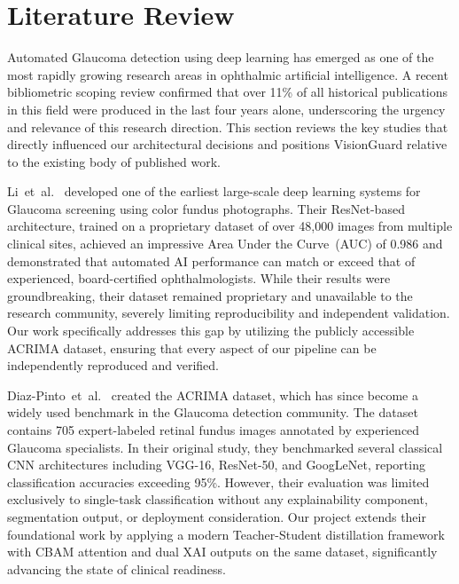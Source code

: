 \documentclass[conference]{IEEEtran}
\begin{document}
\section{Literature Review}

Automated Glaucoma detection using deep learning has emerged as one of the most rapidly growing research areas in ophthalmic artificial intelligence. A recent bibliometric scoping review confirmed that over 11\% of all historical publications in this field were produced in the last four years alone, underscoring the urgency and relevance of this research direction. This section reviews the key studies that directly influenced our architectural decisions and positions VisionGuard relative to the existing body of published work.

Li~et~al.~\cite{li2018} developed one of the earliest large-scale deep learning systems for Glaucoma screening using color fundus photographs. Their ResNet-based architecture, trained on a proprietary dataset of over 48,000 images from multiple clinical sites, achieved an impressive Area Under the Curve~(AUC) of 0.986 and demonstrated that automated AI performance can match or exceed that of experienced, board-certified ophthalmologists. While their results were groundbreaking, their dataset remained proprietary and unavailable to the research community, severely limiting reproducibility and independent validation. Our work specifically addresses this gap by utilizing the publicly accessible ACRIMA dataset, ensuring that every aspect of our pipeline can be independently reproduced and verified.

Diaz-Pinto~et~al.~\cite{diazpinto2019} created the ACRIMA dataset, which has since become a widely used benchmark in the Glaucoma detection community. The dataset contains 705 expert-labeled retinal fundus images annotated by experienced Glaucoma specialists. In their original study, they benchmarked several classical CNN architectures including VGG-16, ResNet-50, and GoogLeNet, reporting classification accuracies exceeding 95\%. However, their evaluation was limited exclusively to single-task classification without any explainability component, segmentation output, or deployment consideration. Our project extends their foundational work by applying a modern Teacher-Student distillation framework with CBAM attention and dual XAI outputs on the same dataset, significantly advancing the state of clinical readiness.
\end{document}
